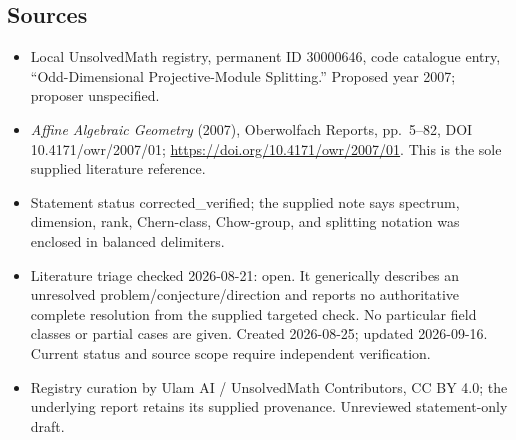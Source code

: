 \documentclass[11pt]{article}
\begin{document}
\subsection{Sources}
\begin{itemize}
\item Local UnsolvedMath registry, permanent ID 30000646, code catalogue entry, ``Odd-Dimensional Projective-Module Splitting.'' Proposed year 2007; proposer unspecified.
\item \emph{Affine Algebraic Geometry} (2007), Oberwolfach Reports, pp.\ 5--82, DOI 10.4171/owr/2007/01; \url{https://doi.org/10.4171/owr/2007/01}. This is the sole supplied literature reference.
\item Statement status corrected\_verified; the supplied note says spectrum, dimension, rank, Chern-class, Chow-group, and splitting notation was enclosed in balanced delimiters.
\item Literature triage checked 2026-08-21: open. It generically describes an unresolved problem/conjecture/direction and reports no authoritative complete resolution from the supplied targeted check. No particular field classes or partial cases are given. Created 2026-08-25; updated 2026-09-16. Current status and source scope require independent verification.
\item Registry curation by Ulam AI / UnsolvedMath Contributors, CC BY 4.0; the underlying report retains its supplied provenance. Unreviewed statement-only draft.
\end{itemize}
\end{document}
